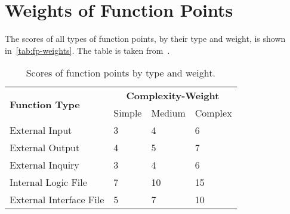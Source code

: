 \section{Weights of Function Points}
The scores of all types of function points, by their type and weight, is shown in~\autoref{tab:fp-weights}. The table is taken from~\cite{cocomo-manual}.
\begin{table}
    \centering
    \begin{tabular}{| l | l | l | l |}
        \hline
        \multirow{2}{*}{\textbf{Function Type}} & \multicolumn{3}{c|}{\textbf{Complexity-Weight}} \\
        \cline{2-4}
        & Simple & Medium & Complex \\
        \hline
        External Input          & 3     & 4     & 6     \\
        External Output         & 4     & 5     & 7     \\
        External Inquiry        & 3     & 4     & 6     \\
        Internal Logic File     & 7     & 10    & 15    \\
        External Interface File & 5     & 7     & 10    \\
        \hline
    \end{tabular}
    \caption{Scores of function points by type and weight.}
    \label{tab:fp-weights}
\end{table}
